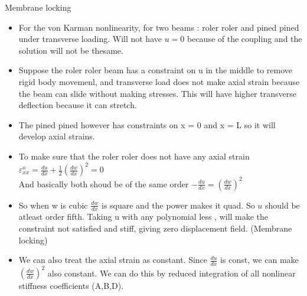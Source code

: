 	\begin{frame}{Membrane locking}
		\small
		\begin{itemize}
			\item For the von Karman nonlinearity, for two beams : roler roler and pined pined under transverse loading. Will not have $u = 0$ because of the coupling and the solution will not be thesame. 
			\item  Suppose the roler roler beam has a constraint on u in the middle to remove rigid body movemenl, and transverse load does not make axial strain because the beam can slide without making stresses. This will have higher transverse deflection because it can stretch.
			\item The pined pined however has constraints on x = 0 and x = L so it will develop axial strains.
			\item  To make sure that the roler roler does not have any axial strain \\
			$\varepsilon_{xx}^o = \frac{du}{dx}+\frac{1}{2}(\frac{dw}{dx})^2 = 0$\\
			And basically both shoud be of the same order $-\frac{du}{dx} = \left(\frac{dw}{dx} \right)^2$
			\item So when w is cubic $\frac{dw}{dx}$ is square and the power makes it quad. So $u$ should be atleast order fifth. Taking u with any polynomial less , will make the constraint not satisfied and stiff, giving zero displacement field. (Membrane locking)
			\item We can also treat the axial strain  as constant. Since $\frac{du}{dx}$ is const, we can make $(\frac{dw}{dx})^2$ also constant. We can do this by reduced integration of all nonlinear stiffness coefficients (A,B,D).
		\end{itemize}
	\end{frame}


